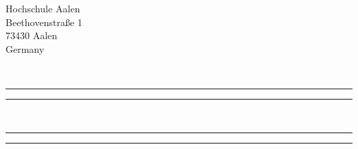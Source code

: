 \pagestyle{empty}

\pagenumbering{}
\begin{center}

\begin{flushleft}
	\vspace{0.3\baselineskip} %
	
	Hochschule Aalen \\
	Beethovenstraße 1\\
	73430 Aalen\\
	Germany\\
\end{flushleft}
	
	\vspace*{\baselineskip}
	
	
	{\Large }
	
	\vspace*{\baselineskip} 
	
	
	
	
	
	{\Large \autoren\\}
	
	\rule{\textwidth}{0.4pt}\vspace*{-\baselineskip}\vspace{3.2pt} %
	\rule{\textwidth}{1.6pt} %
	
	
	\vspace{0.75\baselineskip} 
	
	{\LARGE \textbf{\titellang} \\} 
	
	\vspace{0.75\baselineskip} 
	\rule{\textwidth}{1.6pt}\vspace*{-\baselineskip}\vspace*{2pt} %
	\rule{\textwidth}{0.4pt} %
	

\end{center}
